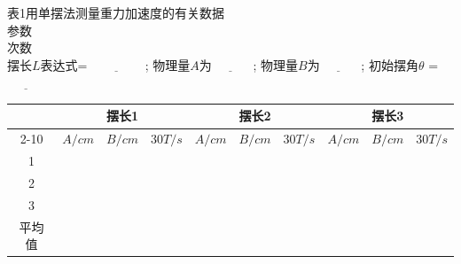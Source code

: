 \documentclass{ctexart}
\begin{document}
表1\hspace{3em}用单摆法测量重力加速度的有关数据\\
参数\\
次数\\
摆长$L$表达式= $\underline{\hspace{4em}}$ ; 物理量$A$为$\underline{\hspace{3em}}$ ; 物理量$B$为$\underline{\hspace{3em}}$ ; 初始摆角$\theta$ = $\underline{\hspace{3em}}$\\
\begin{table}[]
\begin{tabular}{|c|ccc|ccc|ccc|}
\hline
\multirow{2}{*}{}    & \multicolumn{3}{c|}{摆长1}                                                  & \multicolumn{3}{c|}{摆长2}                                                  & \multicolumn{3}{c|}{摆长3}                                                  \\ \cline{2-10} 
                     & \multicolumn{1}{c|}{$A/cm$} & \multicolumn{1}{c|}{$B/cm$} & $30T/s$             & \multicolumn{1}{c|}{$A/cm$} & \multicolumn{1}{c|}{$B/cm$} & $30T/s$             & \multicolumn{1}{c|}{$A/cm$} & \multicolumn{1}{c|}{$B/cm$} & $30T/s$             \\ \hline
1                    & \multicolumn{1}{c|}{}     & \multicolumn{1}{c|}{}     &                   & \multicolumn{1}{c|}{}     & \multicolumn{1}{c|}{}     &                   & \multicolumn{1}{c|}{}     & \multicolumn{1}{c|}{}     &                   \\ \hline
2                    & \multicolumn{1}{c|}{}     & \multicolumn{1}{c|}{}     &                   & \multicolumn{1}{c|}{}     & \multicolumn{1}{c|}{}     &                   & \multicolumn{1}{c|}{}     & \multicolumn{1}{c|}{}     &                   \\ \hline
3                    & \multicolumn{1}{c|}{}     & \multicolumn{1}{c|}{}     &                   & \multicolumn{1}{c|}{}     & \multicolumn{1}{c|}{}     &                   & \multicolumn{1}{c|}{}     & \multicolumn{1}{c|}{}     &                   \\ \hline
\multirow{3}{*}{平均值}                    & \multicolumn{1}{c|}{}   & \multicolumn{1}{c|}{}                                                 & \multirow{3}{*}{}                                & \multicolumn{1}{c|}{}                                                                   &           \multicolumn{1}{c|}{}                                                                & \multirow{3}{*}{}                                                      & \multicolumn{1}{c|}{}                                              & \multicolumn{1}{c|}{}                                                                 & \multirow{3}{*}{} \\ \cline{2-3} \cline{5-6} \cline{8-9}

\end{tabular}
\end{table}
\end{document}
